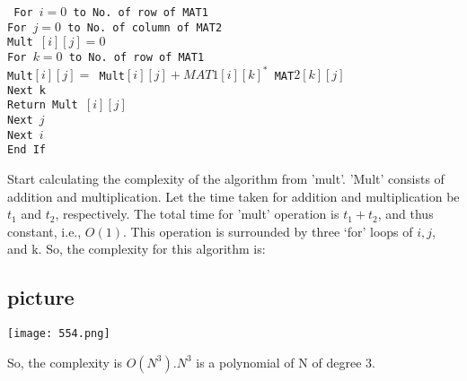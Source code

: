 \documentclass[9pt]{beamer}
\begin{document}
\begin{frame}

\texttt{
\hspace*{2.5cm} For $i = 0$ to No. of row of MAT1 \\
\hspace*{3cm} For $j = 0$ to No. of column of MAT2 \\
\hspace*{3.5cm} Mult $[i][j] = 0$ \\
\hspace*{3.5cm} For $k = 0$ to No. of row of MAT1 \\
\hspace*{4cm} Mult$[i][j]=$ Mult$[i][j] + MAT1[i][k] ^{*}$ MAT$2[k][j]$ \\
\hspace*{3.5cm} Next k \\
\hspace*{4cm} Return Mult $[i][j]$ \\
\hspace*{3cm} Next $j$ \\
\hspace*{2.5cm} Next $i$ \\
\hspace*{2cm} End If \\
}
\end{frame}

\begin{frame}
\hspace*{0.5cm} Start calculating the complexity of the algorithm from 'mult'. 'Mult' consists of addition and multiplication.
Let the time taken for addition and multiplication be $t_1$ and $t_2$, respectively. The total time for
'mult' operation is $t_1+t_2$, and thus constant, i.e., $O(1)$. This operation is surrounded by three ‘for’ loops
of $i, j$, and k. So, the complexity for this algorithm is:\\

\begin{center}
\section{picture}
\texttt{[image: 554.png]}
\end{center}

\hspace*{0.5cm} So, the complexity is $O(N^{3}). N^{3}$ is a polynomial of N of degree 3.\\

\vspace*{0.5cm}
\end{frame}
\end{document}
